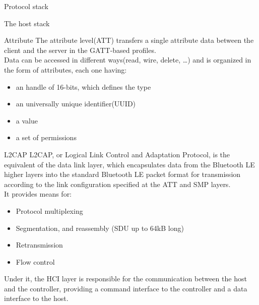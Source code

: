 \begin{section}{Protocol stack}
\begin{subsection}{The host stack}
    \begin{subsubsection}{Attribute}
      The attribute level(ATT) transfers a single attribute data between the client and the server
      in the GATT-based profiles.\\
      Data can be accessed in different ways(read, wire, delete, \dots) and is organized in the form
      of attributes, each one having:
      \begin{itemize}
        \item an handle of 16-bits, which defines the type 
        \item an universally unique identifier(UUID)
        \item a value
        \item a set of permissions
      \end{itemize}
    \end{subsubsection}

    \begin{subsubsection}{L2CAP}
      L2CAP, or Logical Link Control and Adaptation Protocol, is the equivalent of the data link layer,
      which encapsulates data from the Bluetooth LE higher layers into the standard Bluetooth LE
      packet format for transmission according to the link configuration specified at the ATT and
      SMP layers.\\
      It provides means for:
      \begin{itemize}
        \item Protocol multiplexing
        \item Segmentation, and reassembly (SDU up to 64kB long)
        \item Retransmission
        \item Flow control
      \end{itemize}
      Under it, the HCI layer is responsible for the communication between the host and the
      controller, providing a command interface to the controller and a data interface to the host.

    \end{subsubsection}


\end{subsection}
\end{section}
